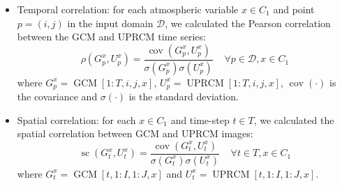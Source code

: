 \documentclass[a4paper,11pt,oneside]{report}
\begin{document}
\begin{itemize}
    \begin{itemize}
        \item Temporal correlation: for each atmospheric variable $x\in C_1$ and point $p = (i,j)$ in the input domain $\mathcal{D}$, we calculated the Pearson correlation between the GCM and UPRCM time series:
        \begin{equation}\label{eq:temporal-corr}
            \rho\left(G_{p}^x,U_{p}^x\right) = \frac{\operatorname{cov}(G_{p}^x,U_{p}^x)}{\sigma(G_{p}^x)\sigma(U_{p}^x)} \;\;\;\; \forall p \in \mathcal{D}, x\in C_1 
        \end{equation}
        where $G_{p}^x = \operatorname{GCM}[1:T, i, j, x]$, $U_{p}^x = \operatorname{UPRCM}[1:T, i, j, x]$, $\operatorname {cov}(\cdot)$  is the covariance and  $\sigma(\cdot)$ is the standard deviation.  
        \item Spatial correlation: for each $x\in C_1$ and time-step $t \in T$, we calculated the spatial correlation between GCM and UPRCM images: 
        \begin{equation}\label{eq:spatial-corr}
            \operatorname{sc}\left(G_{t}^x,U_{t}^x\right) = \frac{\operatorname{cov}(G_{t}^x,U_{t}^x)}{\sigma(G_{t}^x)\sigma(U_{t}^x)} \;\;\;\; \forall t \in T, x\in C_1 
        \end{equation}
        where $G_{t}^x = \operatorname{GCM}[t,1:I,1:J,x]$ and $U_{t}^x =\operatorname{UPRCM}[t,1:I,1:J,x]$. 
    \end{itemize}
\end{itemize}
\end{document}
